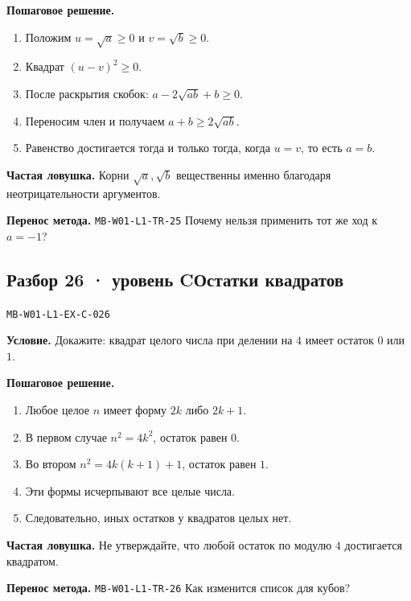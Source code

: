 \documentclass[11pt,a4paper,openany]{book}
\newcommand{\mtag}[1]{\textsf{\small\color{mbaccent}\bfseries #1}}
\newcommand{\muid}[1]{\texttt{\footnotesize #1}}
\begin{document}
\textbf{Пошаговое решение.}\par
\begin{enumerate}[label=\arabic*),leftmargin=*,itemsep=3pt,topsep=4pt]
\item Положим $u=\sqrt a\ge0$ и $v=\sqrt b\ge0$.
\item Квадрат $(u-v)^2\ge0$.
\item После раскрытия скобок: $a-2\sqrt{ab}+b\ge0$.
\item Переносим член и получаем $a+b\ge2\sqrt{ab}$.
\item Равенство достигается тогда и только тогда, когда $u=v$, то есть $a=b$.
\end{enumerate}


\begin{learnbox}\textbf{Частая ловушка.} Корни $\sqrt a,\sqrt b$ вещественны именно благодаря неотрицательности аргументов.\par \textbf{Перенос метода.} \muid{MB-W01-L1-TR-25} Почему нельзя применить тот же ход к $a=-1$?\end{learnbox}

\subsection*{\mtag{Разбор 26 · уровень C}\quad Остатки квадратов}\hypertarget{MB-W01-L1-EX-C-026}{}

\muid{MB-W01-L1-EX-C-026}\par

\begin{keybox}\textbf{Условие.} Докажите: квадрат целого числа при делении на $4$ имеет остаток $0$ или $1$.\end{keybox}

\textbf{Пошаговое решение.}\par
\begin{enumerate}[label=\arabic*),leftmargin=*,itemsep=3pt,topsep=4pt]
\item Любое целое $n$ имеет форму $2k$ либо $2k+1$.
\item В первом случае $n^2=4k^2$, остаток равен $0$.
\item Во втором $n^2=4k(k+1)+1$, остаток равен $1$.
\item Эти формы исчерпывают все целые числа.
\item Следовательно, иных остатков у квадратов целых нет.
\end{enumerate}


\begin{learnbox}\textbf{Частая ловушка.} Не утверждайте, что любой остаток по модулю $4$ достигается квадратом.\par \textbf{Перенос метода.} \muid{MB-W01-L1-TR-26} Как изменится список для кубов?\end{learnbox}
\end{document}
